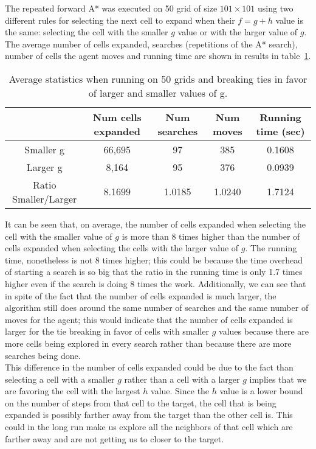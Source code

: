 \documentclass{article}
\begin{document}
The repeated forward A* was executed on 50 grid of size $101 \times 101$ using two different rules for selecting the next cell to expand when their $f = g + h$ value is the same: selecting the cell with the smaller $g$ value or with the larger value of $g$. The average number of cells expanded, searches (repetitions of the A* search), number of cells the agent moves and running time are shown in results in table~\ref{tab:comp_g}.

\begin{table}[ht]
  \begin{center}
    \begin{tabular}{|*{5}{c|}}
      \cline{2-5}
      \multicolumn{1}{c|}{} & Num cells expanded & Num searches & Num moves & Running time (sec) \\ \hline
      Smaller g & 66,695  & 97 & 385 & 0.1608\\ \hline 
      Larger g & 8,164  & 95 & 376 & 0.0939 \\ \hline \hline
      Ratio Smaller/Larger & 8.1699&1.0185&1.0240&1.7124 \\ \hline
    \end{tabular}
  \end{center}
  \caption{Average statistics when running on 50 grids and breaking ties in favor of larger and smaller values of g.}
  \label{tab:comp_g}
\end{table}

It can be seen that, on average, the number of cells expanded when selecting the cell with the smaller value of $g$ is more than 8 times higher than the number of cells expanded when selecting the cells with the larger value of $g$. The running time, nonetheless is not 8 times higher; this could be because the time overhead of starting a search is so big that the ratio in the running time is only 1.7 times higher even if the search is doing 8 times the work. Additionally, we can see that in spite of the fact that the number of cells expanded is much larger, the algorithm still does around the same number of searches and the same number of moves for the agent; this would indicate that the number of cells expanded is larger for the tie breaking in favor of cells with smaller $g$ values because there are more cells being explored in every search rather than because there are more searches being done.\\
This difference in the number of cells expanded could be due to the fact than selecting a cell with a smaller $g$ rather than a cell with a larger $g$ implies that we are favoring the cell with the largest $h$ value. Since the $h$ value is a lower bound on the number of steps from that cell to the target, the cell that is being expanded is possibly farther away from the target than the other cell is. This could in the long run make us explore all the neighbors of that cell which are farther away and are not getting us to closer to the target.
\end{document}
